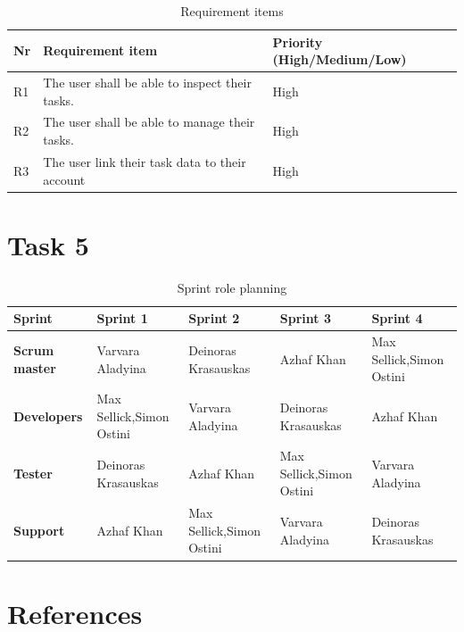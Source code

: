 \documentclass{article}
\begin{document}
\begin{table}[h]
  \centering
  \begin{tabularx}{\textwidth}{l|X|l}
    \toprule
    \textbf{Nr} & \textbf{Requirement item}                      & \textbf{Priority (High/Medium/Low)} \\
    \hline\hline
    R1          & The user shall be able to inspect their tasks. & High                                \\
    \hline
    R2          & The user shall be able to manage their tasks.  & High                                \\
    \hline
    R3          & The user link their task data to their account & High                                \\
    \bottomrule
  \end{tabularx}
  \caption{Requirement items}
  \label{Requirement items}
\end{table}

\clearpage

\section{Task 5}

\begin{table}[h]
  \centering
  \begin{tabularx}{\textwidth}{l|X|X|X|X}
    \toprule
    \textbf{Sprint}       & Sprint 1                          & Sprint 2                          & Sprint 3                          & Sprint 4                          \\
    \hline\hline
    \textbf{Scrum master} & Varvara Aladyina                  & Deinoras Krasauskas               & Azhaf Khan                        & Max Sellick,\newline Simon Ostini \\
    \hline
    \textbf{Developers}   & Max Sellick,\newline Simon Ostini & Varvara Aladyina                  & Deinoras Krasauskas               & Azhaf Khan                        \\
    \hline
    \textbf{Tester}       & Deinoras Krasauskas               & Azhaf Khan                        & Max Sellick,\newline Simon Ostini & Varvara Aladyina                  \\
    \hline
    \textbf{Support}      & Azhaf Khan                        & Max Sellick,\newline Simon Ostini & Varvara Aladyina                  & Deinoras Krasauskas               \\
    \bottomrule
  \end{tabularx}
  \caption{Sprint role planning}
  \label{Sprint role planning}
\end{table}

\clearpage

\section{References}
\printbibliography[heading=none]
\end{document}
